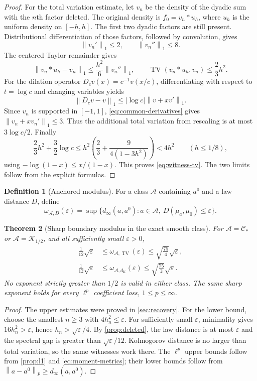 \documentclass[11pt,a4paper]{article}
\numberwithin{equation}{section}
\newtheorem{theorem}{Theorem}[section]
\theoremstyle{definition}
\newtheorem{definition}[theorem]{Definition}
\theoremstyle{remark}
\DeclareMathOperator{\TV}{TV}
\newcommand{\C}{\mathcal C}
\newcommand{\K}{\mathcal K}
\newcommand{\eps}{\varepsilon}
\newcommand{\norm}[1]{\left\lVert #1\right\rVert}
\newcommand{\dK}{d_{\mathrm K}}
\begin{document}
\begin{proof}
For the total variation estimate, let $v_n$ be the density of the dyadic
sum with the $n$th factor deleted. The original density is
$f_0=v_n*u_h$, where $u_h$ is the uniform density on $[-h,h]$.
The first two dyadic factors are still present. Distributional differentiation
of those factors, followed by convolution, gives
\begin{equation}
 \norm{v_n'}_1\le2,\qquad \norm{v_n''}_1\le8.
 \label{eq:common-derivatives}
\end{equation}
The centered Taylor remainder gives
\[
 \norm{v_n*u_h-v_n}_1\le\frac{h^2}{6}\norm{v_n''}_1,
 \qquad \TV(v_n*u_h,v_n)\le\frac23h^2.
\]
For the dilation operator $D_cv(x)=c^{-1}v(x/c)$, differentiating with
respect to $t=\log c$ and changing variables yields
\[
 \norm{D_cv-v}_1\le|\log c|\norm{v+xv'}_1.
\]
Since $v_n$ is supported in $[-1,1]$, \eqref{eq:common-derivatives} gives
$\norm{v_n+xv_n'}_1\le3$. Thus the additional total variation from
rescaling is at most $3\log c/2$. Finally
\[
 \frac23h^2+\frac32\log c
 \le h^2\left(\frac23+\frac{9}{4(1-3h^2)}\right)<4h^2
 \qquad(h\le1/8),
\]
using $-\log(1-x)\le x/(1-x)$. This proves \eqref{eq:witness-tv}.
The two limits follow from the explicit formulas.
\end{proof}

\begin{definition}[Anchored modulus]
For a class $\mathcal A$ containing $a^0$ and a law distance $D$, define
\begin{equation}
 \omega_{\mathcal A,D}(\eps)=
 \sup\{d_\infty(a,a^0):a\in\mathcal A,
                           \ D(\mu_a,\mu_0)\le\eps\}.
 \label{eq:modulus}
\end{equation}
\end{definition}

\begin{theorem}[Sharp boundary modulus in the exact smooth class]
\label{thm:sharp-modulus}
For $\mathcal A=\C_*$ or $\mathcal A=\K_{1/2}$, and all sufficiently
small $\eps>0$,
\begin{align}
 \frac1{12}\sqrt\eps
 &\le\omega_{\mathcal A,\TV}(\eps)
 \le\sqrt{\frac{75}{4}}\sqrt\eps, \label{eq:sharp-TV}\\
 \frac1{12}\sqrt\eps
 &\le\omega_{\mathcal A,\dK}(\eps)
 \le\sqrt{\frac{75}{2}}\sqrt\eps. \label{eq:sharp-K}
\end{align}
No exponent strictly greater than $1/2$ is valid in either class. The same
sharp exponent holds for every $\ell^p$ coefficient loss, $1\le p\le\infty$.
\end{theorem}
\begin{proof}
The upper estimates were proved in \cref{sec:recovery}. For the lower bound,
choose the smallest $n\ge3$ with $4h_n^2\le\eps$. For sufficiently small
$\eps$, minimality gives $16h_n^2>\eps$, hence $h_n>\sqrt\eps/4$.
By \cref{prop:deleted}, the law distance is at most $\eps$ and the spectral
gap is greater than $\sqrt\eps/12$. Kolmogorov distance is no larger than
total variation, so the same witnesses work there. The $\ell^p$ upper
bounds follow from \cref{prop:l1} and \eqref{eq:moment-metrics}; their lower
bounds follow from $\norm{a-a^0}_p\ge d_\infty(a,a^0)$.
\end{proof}
\end{document}
